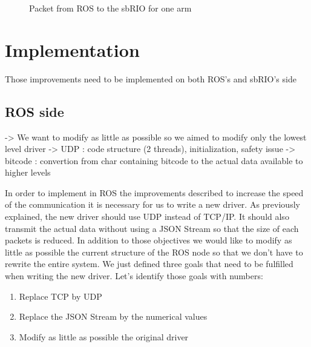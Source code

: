 \begin{figure}[H]
\centering
{}
\caption{Packet from ROS to the sbRIO for one arm}
\label{sent_packet}
\end{figure}

\section{Implementation}
Those improvements need to be implemented on both ROS's and sbRIO's side

\subsection{ROS side}

-> We want to modify as little as possible so we aimed to modify only the lowest level driver
-> UDP : code structure (2 threads), initialization, safety issue
-> bitcode : convertion from char containing bitcode to the actual data available to higher levels

In order to implement in ROS the improvements described to increase the speed of the communication it is necessary for us to write a new driver. As previously explained, the new driver should use UDP instead of TCP/IP. It should also transmit the actual data without using a JSON Stream so that the size of each packets is reduced. In addition to those objectives we would like to modify as little as possible the current structure of the ROS node so that we don't have to rewrite the entire system. 
We just defined three goals that need to be fulfilled when writing the new driver. Let's identify those goals with numbers:
\begin{enumerate}
	\item Replace TCP by UDP
	\item Replace the JSON Stream by the numerical values
	\item Modify as little as possible the original driver
\end{enumerate}

